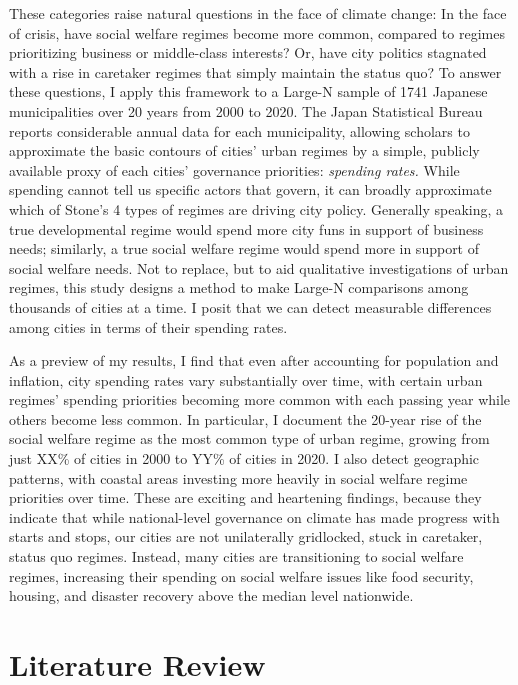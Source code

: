 \documentclass[preprint, 3p,
authoryear]{elsarticle} %
\begin{document}
These categories raise natural questions in the face of climate change:
In the face of crisis, have social welfare regimes become more common,
compared to regimes prioritizing business or middle-class interests? Or,
have city politics stagnated with a rise in caretaker regimes that
simply maintain the status quo? To answer these questions, I apply this
framework to a Large-N sample of 1741 Japanese municipalities over 20
years from 2000 to 2020. The Japan Statistical Bureau reports
considerable annual data for each municipality, allowing scholars to
approximate the basic contours of cities' urban regimes by a simple,
publicly available proxy of each cities' governance priorities:
\emph{spending rates.} While spending cannot tell us specific actors
that govern, it can broadly approximate which of Stone's
\citeyearpar{stone_1993} 4 types of regimes are driving city policy.
Generally speaking, a true developmental regime would spend more city
funs in support of business needs; similarly, a true social welfare
regime would spend more in support of social welfare needs. Not to
replace, but to aid qualitative investigations of urban regimes, this
study designs a method to make Large-N comparisons among thousands of
cities at a time. I posit that we can detect measurable differences
among cities in terms of their spending rates.

As a preview of my results, I find that even after accounting for
population and inflation, city spending rates vary substantially over
time, with certain urban regimes' spending priorities becoming more
common with each passing year while others become less common. In
particular, I document the 20-year rise of the social welfare regime as
the most common type of urban regime, growing from just XX\% of cities
in 2000 to YY\% of cities in 2020. I also detect geographic patterns,
with coastal areas investing more heavily in social welfare regime
priorities over time. These are exciting and heartening findings,
because they indicate that while national-level governance on climate
has made progress with starts and stops, our cities are not unilaterally
gridlocked, stuck in caretaker, status quo regimes. Instead, many cities
are transitioning to social welfare regimes, increasing their spending
on social welfare issues like food security, housing, and disaster
recovery above the median level nationwide.

\hypertarget{literature-review}{%
\section{Literature Review}\label{literature-review}}
\end{document}
